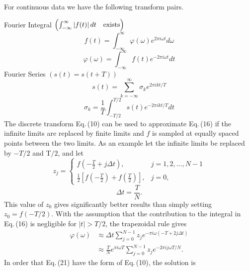 \documentclass[twoside]{MATH77}
\begin{document}
For continuous data we have the following transform pairs.

Fourier Integral $\left( \int_{-\infty }^\infty |f(t)|\,dt\text{\quad
exists}\right)$%
\begin{equation}\label{O15}
f(t)=\int_{-\infty }^\infty \varphi (\omega )e^{2\pi i\omega
t}d\omega
\end{equation}
\vspace{-10pt}
\begin{equation}\label{O16}
\varphi (\omega )=\int_{-\infty }^\infty f(t)e^{-2\pi i\omega
t}dt
\end{equation}
Fourier Series $\left( s(t)=s(t+T)\right) $%
\begin{equation}\label{O17}
s(t)=\sum_{k=-\infty }^\infty \sigma _ke^{2\pi ikt/T}
\end{equation}
\vspace{-10pt}
\begin{equation}\label{O18}
\sigma _k=\frac 1T\int_{-T/2}^{T/2}s(t)e^{-2\pi ikt/T}dt
\end{equation}
The discrete transform Eq.\,(10) can be used to approximate Eq.\,(16)
if the infinite limits are replaced by finite limits and $f$ is
sampled at equally spaced points between the two limits. As an
example let the infinite limits be replaced by $-T/2$ and T$/2$, and
let
\begin{equation}\label{O19}
z_j=
\begin{cases}
\displaystyle f(-\frac T2+j\Delta t),&j=1,2,...,N-1\\
\displaystyle \frac 12\left[ f(-\frac T2)+f(\frac T2)\right] ,& j=0,
\end{cases}
\end{equation}
\vspace{-10pt}
\begin{equation}\label{O20}
\Delta t=\frac TN.
\end{equation}
This value of $z_0$ gives significantly better results than simply
setting $z_0=f(-T/2)$. With the assumption that the contribution to
the integral in Eq.\,(16) is negligible for $|t|>T/2$, the trapezoidal
rule gives
\begin{equation}\label{O21}
\begin{split}
\varphi (\omega )&\approx \Delta t\sum_{j=0}^{N-1}z_je^{-\pi
i\omega (-T+2j\Delta t)} \\
&\approx \frac TNe^{\pi i\omega T}\sum_{j=0}^{N-1}z_je^{-2\pi ij\omega T/N}.
\end{split}
\end{equation}
In order that Eq.\,(21) have the form of Eq.\,(10), the solution is
\end{document}
